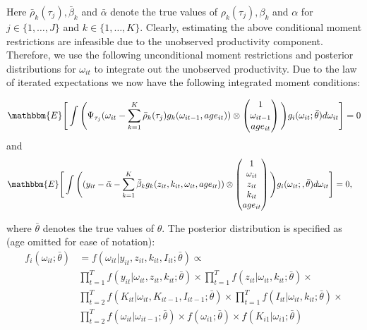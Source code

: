 \documentclass{article}
\begin{document}
Here $\bar{\rho}_{k}(\tau_{j}), \bar{\beta}_{k}$ and $\bar{\alpha}$ denote the true values of $\rho_{k}(\tau_{j}), \beta_{k}$ and $\alpha$ for $j\in\{1,\dots, J\}$ and $k\in\{1,\dots,K\}$. Clearly, estimating the above conditional moment restrictions are infeasible due to the unobserved productivity component. Therefore, we use the following unconditional moment restrictions and posterior distributions for $\omega_{it}$ to integrate out the unobserved productivity. Due to the law of iterated expectations we now have the following integrated moment conditions:

\begin{equation}\label{omegaimc}
\mathbbm{E}\Bigg[\int\Bigg(\Psi_{\tau_{j}}(\omega_{it}-\sum_{k=1}^{K}\bar{\rho}_{k}(\tau_{j})g_{k}(\omega_{it-1}, age_{it}))\otimes
\begin{pmatrix}
1 \\
\omega_{it-1}\\
age_{it}
\end{pmatrix}
\Bigg)g_{i}(\omega_{it};\bar{\theta})d\omega_{it}\Bigg]=0
\end{equation}
and 
\begin{equation}\label{yimc}
\begin{split}
\mathbbm{E}\Bigg[\int\Bigg((y_{it}&-\bar{\alpha}-\sum_{k=1}^{K}\bar{\beta}_{k}g_{k}(z_{it}, k_{it}, \omega_{it},age_{it}))\otimes
\begin{pmatrix}
1 \\
\omega_{it}\\
z_{it}\\
k_{it}\\
age_{it}
\end{pmatrix}
\Bigg)g_{i}(\omega_{it};,\bar{\theta})d\omega_{it}\Bigg]=0,
\end{split}
\end{equation}

where $\bar{\theta}$ denotes the true values of $\theta$. The posterior distribution is specified as (age omitted for ease of notation):
\begin{equation}\label{posterior}
\begin{split}
f_{i}(\omega_{it};\bar{\theta})&=f(\omega_{it}|y_{it}, z_{it}, k_{it}, I_{it}; \bar{\theta}) \propto\\
&\prod_{t=1}^{T}f(y_{it}|\omega_{it}, z_{it}, k_{it};\bar{\theta})\times
\prod_{t=1}^{T}f(z_{it}|\omega_{it}, k_{it};\bar{\theta})\times\\
&\prod_{t=2}^{T}f(K_{it}|\omega_{it}, K_{it-1}, I_{it-1};\bar{\theta})\times \prod_{t=1}^{T}f(I_{it}|\omega_{it}, k_{it}; \bar{\theta})\times \\
&\prod_{t=2}^{T}f(\omega_{it}|\omega_{it-1};\bar{\theta})\times f(\omega_{i1};\bar{\theta})\times f(K_{i1}|\omega_{i1};\bar{\theta})
\end{split}
\end{equation}
\end{document}
